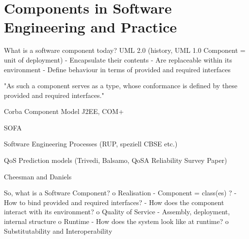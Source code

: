 \section{Components in Software Engineering and Practice}
What is a software component today?
UML 2.0 (history, UML 1.0 Component = unit of deployment)
-	Encapsulate their contents
-	Are replaceable within its environment
-	Define behaviour in terms of provided and required interfaces

"As such a component serves as a type, whose conformance is defined by these provided and required interfaces."

Corba Component Model
J2EE, COM+

SOFA

Software Engineering Processes (RUP, speziell CBSE etc.)

QoS Prediction models (Trivedi, Balsamo, QoSA Reliability Survey Paper)

Cheesman and Daniels

So, what is a Software Component?
o	Realisation
-	Component = class(es) ?
-	How to bind provided and required interfaces?
-	How does the component interact with its environment?
o	Quality of Service
-	Assembly, deployment, internal structure
o	Runtime
-	How does the system look like at runtime?
o	Substitutability and Interoperability
